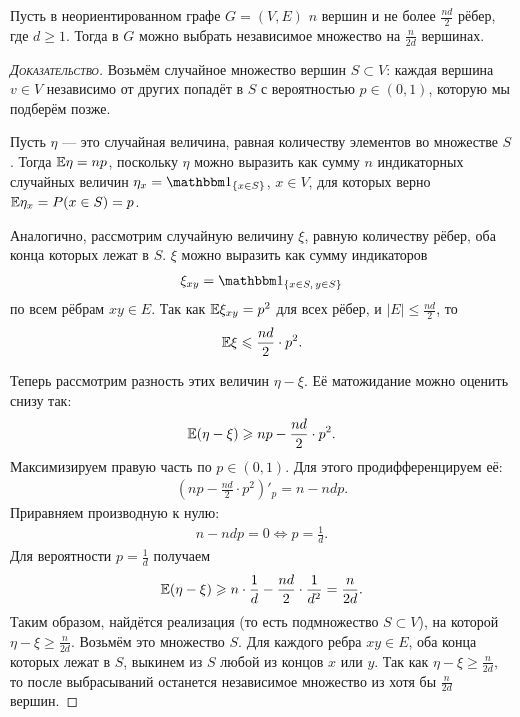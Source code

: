 \documentclass[../main.tex]{subfiles}
\begin{document}
\begin{exmpl}
 Пусть в неориентированном графе $ G = (V,E) $ $ n $ вершин и не более $ \frac{nd}{2} $ рёбер, где $ d \geqslant 1 $. Тогда в $ G $ можно выбрать независимое множество на $ \frac{n}{2d} $ вершинах.
\end{exmpl}
\begin{proof}[\normalfont\textsc{Доказательство}]
 Возьмём случайное множество вершин $ S \subset V $: каждая вершина $ v \in V $ независимо от других попадёт в $ S $ с вероятностью $ p \in (0,1) $, которую мы подберём позже.

 Пусть $ \eta $ --- это случайная величина, равная количеству элементов во множестве $ S $. Тогда $ \mathbb E\eta = np $, поскольку $ \eta $ можно выразить как сумму $ n $ индикаторных случайных величин $ \eta_x = \Ind_{\left\{ x \in S \right\}} $, $ x \in V $, для которых верно $ \mathbb E\eta_x = P(x \in S) = p $.

 Аналогично, рассмотрим случайную величину $ \xi $, равную количеству рёбер, оба конца которых лежат в $ S $. $ \xi $ можно выразить как сумму индикаторов
 \begin{align*}
  \xi_{xy} = \Ind_{\left\{ x \in S,\, y \in S \right\}}
 \end{align*} по всем рёбрам $ xy \in E $. Так как $ \mathbb E\xi_{xy} = p^{2} $ для всех рёбер, и $ \left| E \right| \leqslant \frac{nd}{2} $, то
 \begin{align*}
  \mathbb E\xi \leqslant \frac{nd}{2} \cdot p^{2}.
 \end{align*}

 Теперь рассмотрим разность этих величин $ \eta-\xi $. Её матожидание можно оценить снизу так:
 \begin{align*}
  \mathbb E(\eta - \xi) \geqslant np - \frac{nd}{2} \cdot p^{2}.
 \end{align*} Максимизируем правую часть по $ p \in (0,1) $. Для этого продифференцируем её:
 \begin{align*}
  \left(np - \frac{nd}{2}\cdot p^{2}\right)'_p = n - ndp.
 \end{align*} Приравняем производную к нулю:
 \begin{align*}
  n - ndp = 0 \iff p = \frac{1}{d}.
 \end{align*} Для вероятности $ p = \frac{1}{d} $ получаем
 \begin{align*}
  \mathbb E(\eta-\xi) \geqslant n \cdot \frac{1}{d} - \frac{nd}{2} \cdot \frac{1}{d^{2}} = \frac{n}{2d}.
 \end{align*} Таким образом, найдётся реализация (то есть подмножество $ S \subset V $), на которой $ \eta - \xi \geqslant \frac{n}{2d} $. Возьмём это множество $ S $. Для каждого ребра $ xy \in E$, оба конца которых лежат в $ S $, выкинем из $ S $ любой из концов $ x $ или $ y $. Так как $ \eta-\xi \geqslant \frac{n}{2d} $, то после выбрасываний останется независимое множество из хотя бы $ \frac{n}{2d} $ вершин.
\end{proof}
\end{document}
